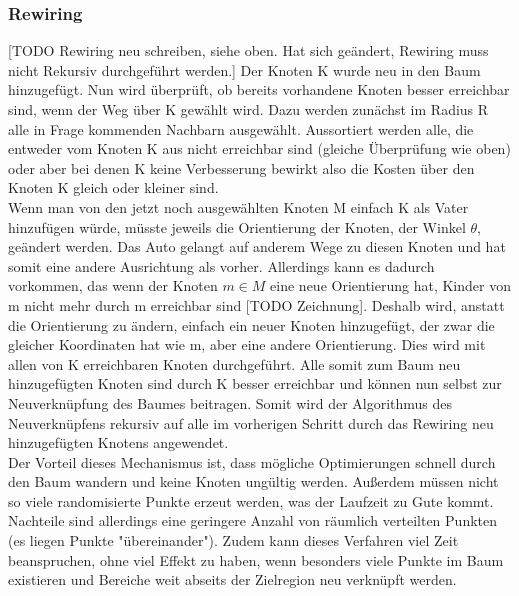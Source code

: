 \subsubsection{Rewiring}
[TODO Rewiring neu schreiben, siehe oben. Hat sich geändert, Rewiring muss nicht Rekursiv durchgeführt werden.] Der Knoten K wurde neu in den Baum hinzugefügt. Nun wird überprüft, ob bereits vorhandene Knoten besser erreichbar sind, wenn der Weg über K gewählt wird.
Dazu werden zunächst im Radius R alle in Frage kommenden Nachbarn ausgewählt. Aussortiert werden alle, die entweder vom Knoten K aus nicht erreichbar sind (gleiche Überprüfung wie oben) oder aber bei denen K keine Verbesserung bewirkt also die Kosten über den Knoten K gleich oder kleiner sind. \\
Wenn man von den jetzt noch ausgewählten Knoten M einfach K als Vater hinzufügen würde, müsste jeweils die Orientierung der Knoten, der Winkel $\theta$, geändert werden. Das Auto gelangt auf anderem Wege zu diesen Knoten und hat somit eine andere Ausrichtung als vorher. Allerdings kann es dadurch vorkommen, das wenn der Knoten $m \in M$ eine neue Orientierung hat, Kinder von m nicht mehr durch m erreichbar sind [TODO Zeichnung]. Deshalb wird, anstatt die Orientierung zu ändern, einfach ein neuer Knoten hinzugefügt, der zwar die gleicher Koordinaten hat wie m, aber eine andere Orientierung. Dies wird mit allen von K erreichbaren Knoten durchgeführt. Alle somit zum Baum neu hinzugefügten Knoten sind durch K besser erreichbar und können nun selbst zur Neuverknüpfung des Baumes beitragen. Somit wird der Algorithmus des Neuverknüpfens rekursiv auf alle im vorherigen Schritt durch das Rewiring neu hinzugefügten Knotens angewendet. \\
Der Vorteil dieses Mechanismus ist, dass mögliche Optimierungen schnell durch den Baum wandern und keine Knoten ungültig werden. Außerdem müssen nicht so viele randomisierte Punkte erzeut werden, was der Laufzeit zu Gute kommt. Nachteile sind allerdings eine geringere Anzahl von räumlich verteilten Punkten (es liegen Punkte "übereinander"). Zudem kann dieses Verfahren viel Zeit beanspruchen, ohne viel Effekt zu haben, wenn besonders viele Punkte im Baum existieren und Bereiche weit abseits der Zielregion neu verknüpft werden.


